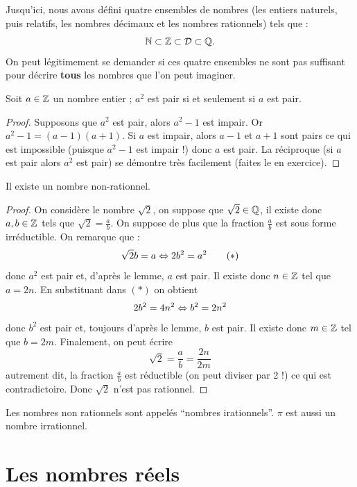 \documentclass[a4paper, 12pt]{report}
\begin{document}
Jusqu'ici, nous avons défini quatre ensembles de nombres (les entiers naturels, puis relatifs, les nombres décimaux et les nombres rationnels) tels que :
\[ \mathbb{N} \subset \mathbb{Z} \subset \mathcal{D} \subset \mathbb{Q}. \]
On peut légitimement se demander si ces quatre ensembles ne sont pas suffisant pour décrire \textbf{tous} les nombres que l'on peut imaginer.

\begin{lem}
Soit $a \in \mathbb{Z}$ un nombre entier ; $a^2$ est pair si et seulement si $a$ est pair.
\end{lem}

\begin{proof}
Supposons que $a^2$ est pair, alors $a^2-1$ est impair. Or $a^2-1=(a-1)(a+1)$. Si $a$ est impair, alors $a-1$ et $a+1$ sont pairs ce qui est impossible (puisque $a^2-1$ est impair !) donc $a$ est pair. La réciproque (si $a$ est pair alors $a^2$ est pair) se démontre très facilement (faites le en exercice).
\end{proof}

\begin{prop}
Il existe un nombre non-rationnel.
\end{prop}

\begin{proof}
On considère le nombre $\sqrt{2}$, on suppose que $\sqrt{2} \in \mathbb{Q}$, il existe donc $a, b \in \mathbb{Z}$ tels que $\sqrt{2}=\frac{a}{b}$. On suppose de plus que la fraction $\frac{a}{b}$ est sous forme irréductible. On remarque que :
\[ \sqrt{2} b = a \Leftrightarrow 2 b^2 = a^2 \qquad (\ast) \]
donc $a^2$ est pair et, d'après le lemme, $a$ est pair. Il existe donc $n \in \mathbb{Z}$ tel que $a=2n$. En substituant dans $(\ast)$ on obtient 
\[ 2 b^2 = 4 n^2 \Leftrightarrow b^2 = 2 n^2 \]
donc $b^2$ est pair et, toujours d'après le lemme, $b$ est pair. Il existe donc $m \in \mathbb{Z}$ tel que $b=2m$. Finalement, on peut écrire 
\[ \sqrt{2} = \frac{a}{b} = \frac{2n}{2m} \]
autrement dit, la fraction $\frac{a}{b}$ est réductible (on peut diviser par 2 !) ce qui est contradictoire. Donc $\sqrt{2}$ n'est pas rationnel.
\end{proof}

\begin{rmq}
Les nombres non rationnels sont appelés ``nombres irationnels''. $\pi$ est aussi un nombre irrationnel.
\end{rmq}

\section{Les nombres réels}
\end{document}
